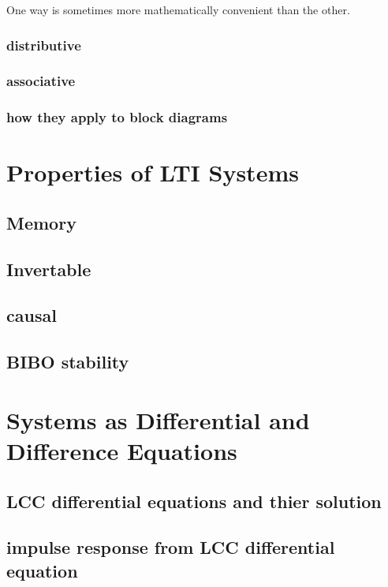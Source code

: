 \documentclass{article}
\begin{document}
  One way is sometimes more mathematically convenient than the other.
  
  \subsubsection{distributive}
  
\subsubsection{associative}
\subsubsection{how they apply to block diagrams}

\newpage
\section{Properties of LTI Systems}
\label{sec:orgdadbbac}
\subsection{Memory}
\label{sec:org3a53807}
\subsection{Invertable}
\label{sec:orgeec0268}
\subsection{causal}
\label{sec:orgdb3dd89}
\subsection{BIBO stability}
\label{sec:org59a881d}

\newpage
\section{Systems as Differential and Difference Equations}
\label{sec:orgc840576}
\subsection{LCC differential equations and thier solution}
\label{sec:org8004f54}
\subsection{impulse response from LCC differential equation}
\label{sec:org808b8e9}
\end{document}
